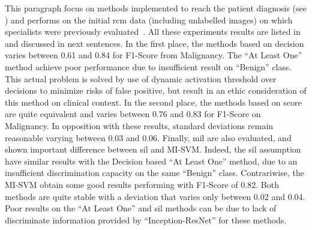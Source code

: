 \documentclass[journal,article,submit,moreauthors,pdftex, applsci]{Definitions/mdpi}
\begin{document}
This paragraph focus on methods implemented to reach the patient diagnosis (see ) and performs on the initial \ac{rcm} data (including unlabelled images) on which specialists were previously evaluated~\cite{Cinotti2018}. All these experiments results are listed in  and discussed in next sentences. In the first place, the methods based on decision varies between 0.61 and 0.84 for F1-Score from Malignancy. The “At Least One” method achieve poor performance due to insufficient result on “Benign” class. This actual problem is solved by use of dynamic activation threshold over decisions to minimize risks of false positive, but result in an ethic consideration of this method on clinical context. In the second place, the methods based on score are quite equivalent and varies between 0.76 and 0.83 for F1-Score on Malignancy. In opposition with these results, standard deviations remain reasonable varying between 0.03 and 0.06. Finally, \ac{mil} are also evaluated, and shown important difference between \ac{sil} and MI-SVM. Indeed, the \ac{sil} assumption have similar results with the Decision based “At Least One” method, due to an insufficient discrimination capacity on the same “Benign” class. Contrariwise, the MI-SVM obtain some good results performing with F1-Score of 0.82. Both methods are quite stable with a deviation that varies only between 0.02 and 0.04. Poor results on the “At Least One” and \ac{sil} methods can be due to lack of discriminate information provided by “Inception-ResNet” for these methods.\par
\end{document}
